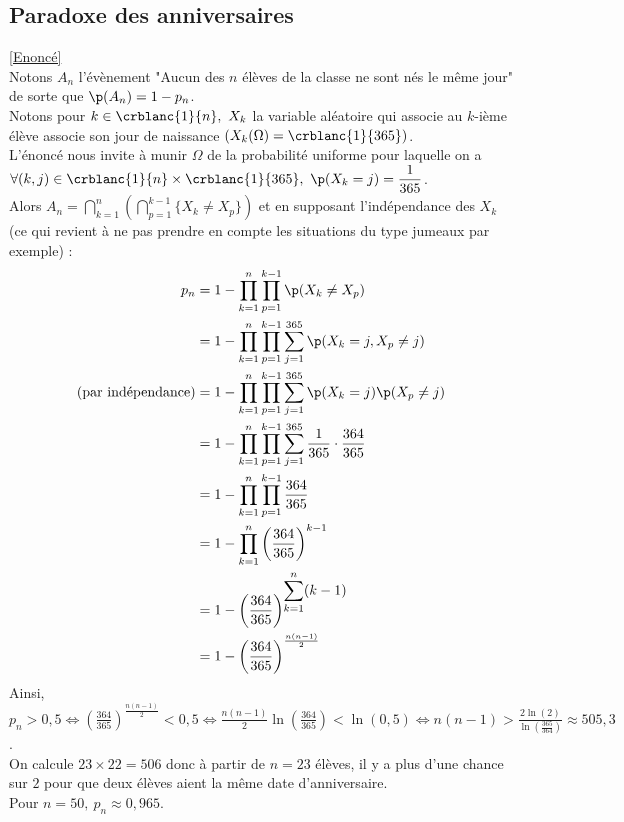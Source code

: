 \documentclass[8pt]{book}
\begin{document}
	\subsection{Paradoxe des anniversaires }
	\label{Paradoxe des anniversaires corrigé}
	\textcolor{blue}{\hyperref[Paradoxe des anniversaires]{[Enoncé]}}\\
	Notons $A_n$ l'évènement "Aucun des $n$ élèves de la classe ne sont nés le même jour" de sorte que $\p(A_n)=1-p_n$.\\
	Notons pour $k\in \crblanc{1}{n},\ X_k$ la variable aléatoire qui associe au $k$-ième élève associe son jour de naissance $(X_k(\Omega)=\crblanc{1}{365})$.\\
	L'énoncé nous invite à munir $\Omega$ de la probabilité uniforme pour laquelle on a $\forall (k,j)\in \crblanc{1}{n}\times\crblanc{1}{365},\ \p(X_k=j)=\displaystyle\frac{1}{365}$.\\
	Alors $A_n=\displaystyle\bigcap\limits_{k=1}^n\left(\bigcap\limits_{p=1}^{k-1}\{X_k\ne X_p\}\right)$ et en supposant l'indépendance des $X_k$ (ce qui revient à ne pas prendre en compte les situations du type jumeaux par exemple) :
	\begin{align*}
		p_n&=1-\displaystyle\prod\limits_{k=1}^n\prod\limits_{p=1}^{k-1}\p(X_k\ne X_p)\\
		&=1-\prod\limits_{k=1}^n\prod\limits_{p=1}^{k-1}\sum\limits_{j=1}^{365}\p(X_k=j,X_p\ne j)\\
		\text{(par indépendance)}&=1-\prod\limits_{k=1}^n\prod\limits_{p=1}^{k-1}\sum\limits_{j=1}^{365}\p(X_k=j)\p(X_p\ne j)\\
		&=1-\prod\limits_{k=1}^n\prod\limits_{p=1}^{k-1}\sum\limits_{j=1}^{365}\frac{1}{365}\cdot\frac{364}{365}\\
		&=1-\prod\limits_{k=1}^n\prod\limits_{p=1}^{k-1}\frac{364}{365}\\
		&=1-\prod\limits_{k=1}^n\left(\frac{364}{365}\right)^{k-1}\\
		&=1-\left(\displaystyle\frac{364}{365}\right)^{\displaystyle\sum\limits_{k=1}^n(k-1)}\\
		&=1-\left(\displaystyle\frac{364}{365}\right)^{\frac{n(n-1)}{2}}
	\end{align*}
	Ainsi, $p_n>0,5\iff \left(\displaystyle\frac{364}{365}\right)^{\frac{n(n-1)}{2}}<0,5\iff \displaystyle\frac{n(n-1)}{2}\ln\left(\displaystyle\frac{364}{365}\right)<\ln(0,5)\iff n(n-1)>\displaystyle\frac{2\ln(2)}{\ln\left(\displaystyle\frac{365}{364}\right)}\approx505,3$.\\
	On calcule $23\times 22=506$ donc à partir de $n=23$ élèves, il y a plus d'une chance sur $2$ pour que deux élèves aient la même date d'anniversaire.\\
	Pour $n=50,\ p_n\approx0,965$.
	
\end{document}
